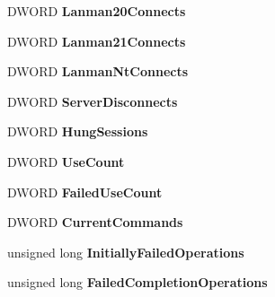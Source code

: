 \begin{DoxyCompactItemize}
D\+W\+O\+RD {\bfseries Lanman20\+Connects}
\item 
\mbox{\label{struct___s_t_a_t___w_o_r_k_s_t_a_t_i_o_n__0_a222102e0aa041a9b570f769104b9a6e5}} 
D\+W\+O\+RD {\bfseries Lanman21\+Connects}
\item 
\mbox{\label{struct___s_t_a_t___w_o_r_k_s_t_a_t_i_o_n__0_a55a31b054899378e3ca953528cb53f66}} 
D\+W\+O\+RD {\bfseries Lanman\+Nt\+Connects}
\item 
\mbox{\label{struct___s_t_a_t___w_o_r_k_s_t_a_t_i_o_n__0_a9c12b14e60f426e7a92f191ce3968d86}} 
D\+W\+O\+RD {\bfseries Server\+Disconnects}
\item 
\mbox{\label{struct___s_t_a_t___w_o_r_k_s_t_a_t_i_o_n__0_ae68a0cc3cc9702336a2662770478a829}} 
D\+W\+O\+RD {\bfseries Hung\+Sessions}
\item 
\mbox{\label{struct___s_t_a_t___w_o_r_k_s_t_a_t_i_o_n__0_afec3a0fbdc3c12b76bed3d1851ab07ce}} 
D\+W\+O\+RD {\bfseries Use\+Count}
\item 
\mbox{\label{struct___s_t_a_t___w_o_r_k_s_t_a_t_i_o_n__0_a83168b18fa1ab5fee9c8018e5e977e1b}} 
D\+W\+O\+RD {\bfseries Failed\+Use\+Count}
\item 
\mbox{\label{struct___s_t_a_t___w_o_r_k_s_t_a_t_i_o_n__0_a940b75dfd45842f28fcb65a54f8a17af}} 
D\+W\+O\+RD {\bfseries Current\+Commands}
\item 
\mbox{\label{struct___s_t_a_t___w_o_r_k_s_t_a_t_i_o_n__0_aa0f130b7ce35e5c0b7ea1780273d58a4}} 
unsigned long {\bfseries Initially\+Failed\+Operations}
\item 
\mbox{\label{struct___s_t_a_t___w_o_r_k_s_t_a_t_i_o_n__0_a2103701c72a7b6895ab65f4aaea5ea76}} 
unsigned long {\bfseries Failed\+Completion\+Operations}
\item 
\mbox{\label{struct___s_t_a_t___w_o_r_k_s_t_a_t_i_o_n__0_a158bfb7a153f9c5a6f112caa23df4b08}} 

\end{DoxyCompactItemize}
